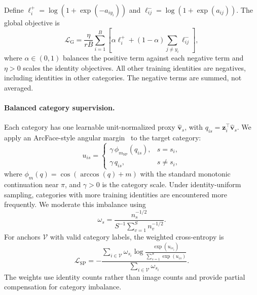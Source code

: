 Define $\ell_i^+=\log(1+\exp(-a_{i y_i}))$ and
$\ell_{ij}^-=\log(1+\exp(a_{ij}))$.
The global objective is
\begin{equation}
\mathcal{L}_{\mathrm{G}}
=\frac{\eta}{rB}\sum_{i=1}^{B}
\left[
\alpha\ell_i^+
+(1-\alpha)\sum_{j\neq y_i}\ell_{ij}^-
\right],
\label{eq:scsf2:global}
\end{equation}
where $\alpha\in(0,1)$ balances the positive term against each negative
term and $\eta>0$ scales the identity objectives.
All other training identities are negatives, including identities in
other categories. The negative terms are summed, not averaged.

\paragraph{Balanced category supervision.}
Each category has one learnable unit-normalized proxy
$\widehat{\mathbf{v}}_s$, with
$q_{is}=\mathbf{z}_i^\top\widehat{\mathbf{v}}_s$.
We apply an ArcFace-style angular margin~\cite{deng2019arcface} to the
target category:
\begin{equation}
u_{is}=
\begin{cases}
\gamma\,\phi_{m_{\mathrm{SP}}}(q_{is}), & s=s_i,\\
\gamma\,q_{is}, & s\neq s_i,
\end{cases}
\label{eq:scsf2:specieslogits}
\end{equation}
where $\phi_m(q)=\cos(\arccos(q)+m)$ with the standard monotonic
continuation near $\pi$, and $\gamma>0$ is the category scale.
Under identity-uniform sampling, categories with more training identities
are encountered more frequently. We moderate this imbalance using
\begin{equation}
\omega_s=
\frac{n_s^{-1/2}}{S^{-1}\sum_{v=1}^{S}n_v^{-1/2}}.
\label{eq:scsf2:weights}
\end{equation}
For anchors $\mathcal{V}$ with valid category labels, the weighted
cross-entropy is
\begin{equation}
\mathcal{L}_{\mathrm{SP}}
=
-\frac{\displaystyle\sum_{i\in\mathcal{V}}\omega_{s_i}
\log\frac{\exp(u_{i s_i})}{\sum_{s=1}^{S}\exp(u_{is})}}
{\displaystyle\sum_{i\in\mathcal{V}}\omega_{s_i}}.
\label{eq:scsf2:species}
\end{equation}
The weights use identity counts rather than image counts and provide
partial compensation for category imbalance.

